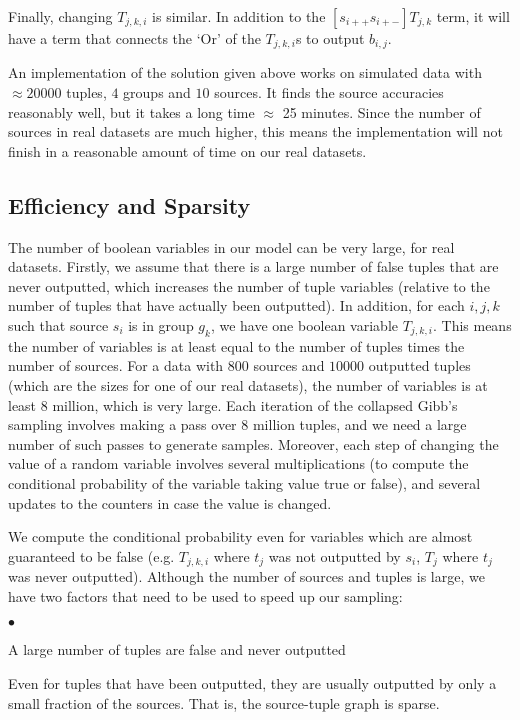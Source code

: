 \documentclass{sig-alternate}
\newcounter{prob}
\newcommand{\squishlist}{
   \begin{list}{$\bullet$}
    { \setlength{\itemsep}{0pt}
      \setlength{\parsep}{2pt}
      \setlength{\topsep}{2pt}
      \setlength{\partopsep}{0pt}
    }
}
\newcommand{\squishend}{\end{list}}
\begin{document}
Finally, changing $T_{j,k,i}$ is similar. In addition to the $[s_{i++} s_{i+-}] T_{j,k}$ term, it will have a term that connects the `Or' of the $T_{j,k,i}$s to output $b_{i,j}$. 

An implementation of the solution given above works on simulated data with $\approx 20000$ tuples, $4$ groups and $10$ sources. It finds the source accuracies reasonably well, but it takes a long time $\approx$ 25 minutes. Since the number of sources in real datasets are much higher, this means the implementation will not finish in a reasonable amount of time on our real datasets. 

\subsection{Efficiency and Sparsity} 
The number of boolean variables in our model can be very large, for real datasets. Firstly, we assume that there is a large number of false tuples that are never outputted, which increases the number of tuple variables (relative to the number of tuples that have actually been outputted). In addition, for each $i, j, k$ such that source $s_i$ is in group $g_k$, we have one boolean variable $T_{j,k,i}$. This means the number of variables is at least equal to the number of tuples times the number of sources. For a data with $800$ sources and $10000$ outputted tuples (which are the sizes for one of our real datasets), the number of variables is at least $8$ million, which is very large. Each iteration of the collapsed Gibb's sampling involves making a pass over $8$ million tuples, and we need a large number of such passes to generate samples. Moreover, each step of changing the value of a random variable involves several multiplications (to compute the conditional probability of the variable taking value true or false), and several updates to the counters in case the value is changed. 

We compute the conditional probability even for variables which are almost guaranteed to be false (e.g. $T_{j,k,i}$ where $t_j$ was not outputted by $s_i$, $T_j$ where $t_j$ was never outputted). Although the number of sources and tuples is large, we have two factors that need to be used to speed up our sampling:
\squishlist
\item A large number of tuples are false and never outputted
\item Even for tuples that have been outputted, they are usually outputted by only a small fraction of the sources. That is, the source-tuple graph is sparse.
\squishend
\end{document}
